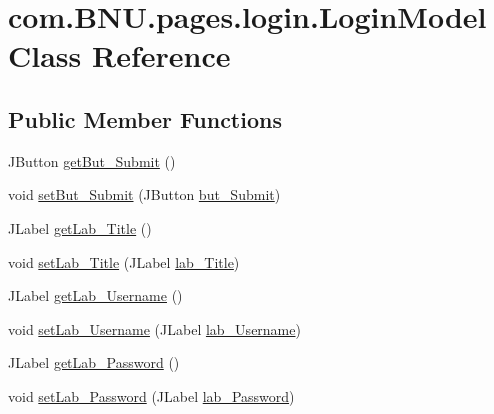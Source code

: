 \hypertarget{classcom_1_1_b_n_u_1_1pages_1_1login_1_1_login_model}{}\section{com.\+B\+N\+U.\+pages.\+login.\+Login\+Model Class Reference}
\label{classcom_1_1_b_n_u_1_1pages_1_1login_1_1_login_model}
\subsection*{Public Member Functions}
\begin{DoxyCompactItemize}
\item 
J\+Button \mbox{\hyperlink{classcom_1_1_b_n_u_1_1pages_1_1login_1_1_login_model_ab2f70b6dab95501c00906c2fead9c3f7}{get\+But\+\_\+\+Submit}} ()
\item 
void \mbox{\hyperlink{classcom_1_1_b_n_u_1_1pages_1_1login_1_1_login_model_a111a8292ec32b94f0ee9ceeb03a4f16e}{set\+But\+\_\+\+Submit}} (J\+Button \mbox{\hyperlink{classcom_1_1_b_n_u_1_1pages_1_1login_1_1_login_model_a3e759762502ffaf68c954f69f52aee0a}{but\+\_\+\+Submit}})
\item 
J\+Label \mbox{\hyperlink{classcom_1_1_b_n_u_1_1pages_1_1login_1_1_login_model_a1fd0be65a635073c2d831a1ba52cd041}{get\+Lab\+\_\+\+Title}} ()
\item 
void \mbox{\hyperlink{classcom_1_1_b_n_u_1_1pages_1_1login_1_1_login_model_a3cd3850e31c0e120c8c8f3c25197cacc}{set\+Lab\+\_\+\+Title}} (J\+Label \mbox{\hyperlink{classcom_1_1_b_n_u_1_1pages_1_1login_1_1_login_model_ab51c28183844a2ea75a7ee6ac940d946}{lab\+\_\+\+Title}})
\item 
J\+Label \mbox{\hyperlink{classcom_1_1_b_n_u_1_1pages_1_1login_1_1_login_model_a9b829f0ff719545193f293caebe977cd}{get\+Lab\+\_\+\+Username}} ()
\item 
void \mbox{\hyperlink{classcom_1_1_b_n_u_1_1pages_1_1login_1_1_login_model_a9b6e34b9e1a77f90b4b3db8457854c8b}{set\+Lab\+\_\+\+Username}} (J\+Label \mbox{\hyperlink{classcom_1_1_b_n_u_1_1pages_1_1login_1_1_login_model_a8336b61544313aa6a50f32be5fb3608b}{lab\+\_\+\+Username}})
\item 
J\+Label \mbox{\hyperlink{classcom_1_1_b_n_u_1_1pages_1_1login_1_1_login_model_a9b7de8e1f638e0781ecb987e8162bd8d}{get\+Lab\+\_\+\+Password}} ()
\item 
void \mbox{\hyperlink{classcom_1_1_b_n_u_1_1pages_1_1login_1_1_login_model_a06812f6e9dac9df11d9af9c4aa781a89}{set\+Lab\+\_\+\+Password}} (J\+Label \mbox{\hyperlink{classcom_1_1_b_n_u_1_1pages_1_1login_1_1_login_model_a15b2461ac4d3a182cdfafe84f1f0c816}{lab\+\_\+\+Password}})

\end{DoxyCompactItemize}
